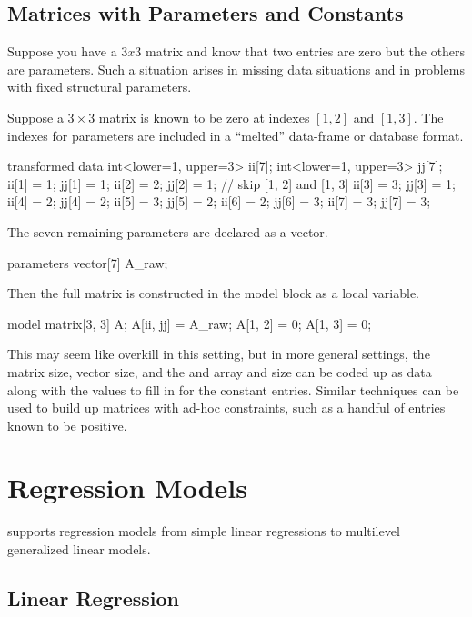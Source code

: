 \section{Matrices with Parameters and Constants}

Suppose you have a $3 x 3$ matrix and know that two entries are zero but the
others are parameters.  Such a situation arises in missing data
situations and in problems with fixed structural parameters.

Suppose a $3 \times 3$ matrix is known to be zero at indexes $[1,2]$
and $[1,3]$.  The indexes for parameters are included in a ``melted''
data-frame or database format.

\begin{stancode}
transformed data {
  int<lower=1, upper=3> ii[7];
  int<lower=1, upper=3> jj[7];
  ii[1] = 1;  jj[1] = 1;
  ii[2] = 2;  jj[2] = 1;   // skip [1, 2] and [1, 3]
  ii[3] = 3;  jj[3] = 1;
  ii[4] = 2;  jj[4] = 2;
  ii[5] = 3;  jj[5] = 2;
  ii[6] = 2;  jj[6] = 3;
  ii[7] = 3;  jj[7] = 3;
}
\end{stancode}
%
The seven remaining parameters are declared as a vector.
%
\begin{stancode}
parameters {
  vector[7] A_raw;
}
\end{stancode}
%
Then the full matrix  is constructed in the model block as a
local variable.
%
\begin{stancode}
model {
  matrix[3, 3] A;
  A[ii, jj] = A_raw;
  A[1, 2] = 0;
  A[1, 3] = 0;
}
\end{stancode}

This may seem like overkill in this setting, but in more general
settings, the matrix size, vector size, and the  and
 array and size can be coded up as data along with the values
to fill in for the constant entries.  Similar techniques can be used
to build up matrices with ad-hoc constraints, such as a handful of
entries known to be positive.


\chapter{Regression Models}

\noindent
\Stan supports regression models from simple linear regressions to
multilevel generalized linear models.  

\section{Linear Regression}

